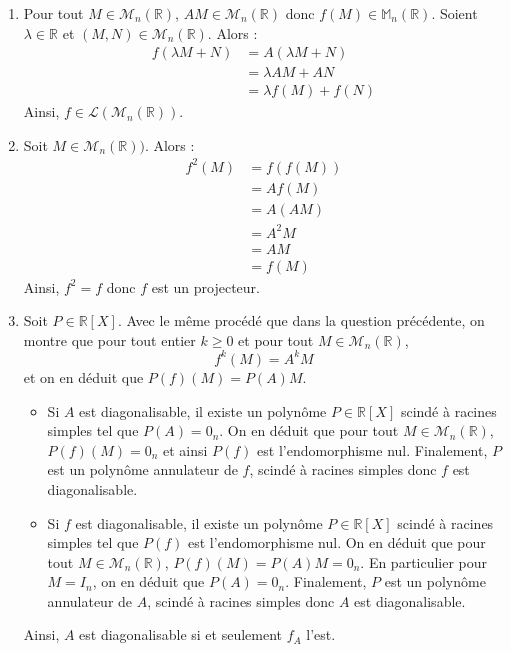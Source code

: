 \documentclass[a4paper,10pt]{report}
\begin{document}
\begin{enumerate}
\item Pour tout $M \in \mathcal{M}_n(\mathbb{R})$, $AM \in \mathcal{M}_n(\mathbb{R})$ donc $f(M) \in \mathbb{M}_n(\mathbb{R})$. Soient $\lambda \in \mathbb{R}$ et $(M,N) \in \mathcal{M}_n(\mathbb{R})$. Alors :
\begin{align*}
f(\lambda M +N) & = A(\lambda M +N) \\
& = \lambda AM + AN \\
& = \lambda f(M)+f(N)
\end{align*}
Ainsi, $f \in \mathcal{L}(\mathcal{M}_n(\mathbb{R}))$.
\item Soit $M \in \mathcal{M}_n(\mathbb{R}))$. Alors :
\begin{align*}
f^2(M) & = f(f(M)) \\
& = Af(M) \\
& = A(AM) \\
& = A^2M \\
& = AM \\
& = f(M)
\end{align*}
Ainsi, $f^2=f$ donc $f$ est un projecteur.
\item Soit $P \in \mathbb{R}[X]$. Avec le même procédé que dans la question précédente, on montre que pour tout entier $k \geq 0$ et pour tout $M \in \mathcal{M}_n(\mathbb{R})$,
$$ f^k(M) = A^k M$$
et on en déduit que $P(f)(M)= P(A) M$.
\begin{itemize}
\item Si $A$ est diagonalisable, il existe un polynôme $P \in \mathbb{R}[X]$ scindé à racines simples tel que $P(A)=0_n$. On en déduit que pour tout $M \in \mathcal{M}_n(\mathbb{R})$, $P(f)(M)= 0_n$ et ainsi $P(f)$ est l'endomorphisme nul. Finalement, $P$ est un polynôme annulateur de $f$, scindé à racines simples donc $f$ est diagonalisable.
\item Si $f$ est diagonalisable, il existe un polynôme $P \in \mathbb{R}[X]$ scindé à racines simples tel que $P(f)$ est l'endomorphisme nul. On en déduit que pour tout $M \in \mathcal{M}_n(\mathbb{R})$, $P(f)(M)= P(A)M=0_n$. En particulier pour $M=I_n$, on en déduit que $P(A)=0_n$. Finalement, $P$ est un polynôme annulateur de $A$, scindé à racines simples donc $A$ est diagonalisable.
\end{itemize}
Ainsi, $A$ est diagonalisable si et seulement $f_A$ l'est.
\end{enumerate}
\end{document}
